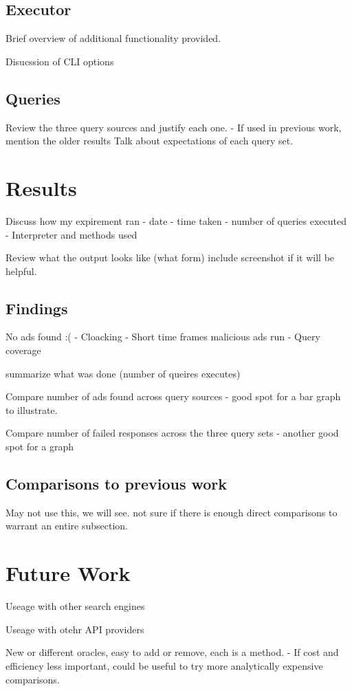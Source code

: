 \documentclass[sigconf]{acmart}
\begin{document}
\subsection{Executor}
Brief overview of additional functionality provided.

Disucssion of CLI options

\subsection{Queries}
Review the three query sources and justify each one.
- If used in previous work, mention the older results
Talk about expectations of each query set.

\section{Results}
\label{sec:results}
Discuss how my expirement ran
- date
- time taken
- number of queries executed
- Interpreter and methods used

Review what the output looks like (what form)
include screenshot if it will be helpful.

\subsection{Findings}
No ads found :(
- Cloacking
- Short time frames malicious ads run
- Query coverage

summarize what was done (number of queires executes)

Compare number of ads found across query sources
- good spot for a bar graph to illustrate.

Compare number of failed responses across the three query sets
- another good spot for a graph

\subsection{Comparisons to previous work}
May not use this, we will see.  not sure if there is enough direct comparisons
to warrant an entire subsection.

\section{Future Work}
\label{sec:future_work}
Useage with other search engines

Useage with otehr API providers

New or different oracles, easy to add or remove, each is a method.
- If cost and efficiency less important, could be useful to try more
analytically expensive comparisons.
\end{document}
